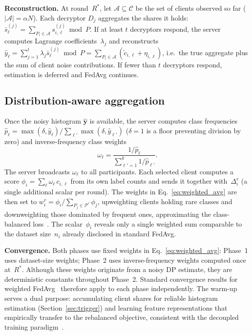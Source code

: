 \documentclass[runningheads]{llncs}
\begin{document}
\textbf{Reconstruction.}
At round~$R^*$, let $\mathcal{A}\!\subseteq\!\mathcal{C}$ be the set of clients observed so far ($|\mathcal{A}|=\alpha N$).
Each decryptor $D_j$ aggregates the shares it holds: $\bar{s}_\ell^{(j)}=\sum_{P_i\in\mathcal{A}}s_{i,\ell}^{(j)}\bmod P$.
If at least $t$ decryptors respond, the server computes Lagrange coefficients~$\lambda_j$ and reconstructs
$\hat{y}_\ell = \sum_{j=1}^{t}\lambda_j\bar{s}_\ell^{(j)}\bmod P
=\sum_{P_i\in\mathcal{A}}(\tilde{c}_{i,\ell}+\eta_{i,\ell})$,
i.e.\ the true aggregate plus the sum of client noise contributions.
If fewer than $t$ decryptors respond, estimation is deferred and FedAvg continues.

\subsection{Distribution-aware aggregation}\label{sec:agg}

Once the noisy histogram $\hat{\mathbf{y}}$ is available, the server computes class frequencies $\hat{p}_\ell=\max(\delta,\hat{y}_\ell)/\sum_{\ell'}\max(\delta,\hat{y}_{\ell'})$ ($\delta\!=\!1$ is a floor preventing division by zero) and inverse-frequency class weights
\begin{equation}\label{eq:omega}
    \omega_\ell = \frac{1/\hat{p}_\ell}{\sum_{\ell'=1}^{k}1/\hat{p}_{\ell'}}.
\end{equation}
The server broadcasts $\omega_\ell$ to all participants.
Each selected client computes a score $\phi_i = \sum_{\ell}\omega_\ell\,c_{i,\ell}$ from its own label counts and sends it together with~$\Delta_i^r$ (a single additional scalar per round).
The weights in Eq.~\eqref{eq:weighted_avg} are then set to $w_i^r = \phi_i / \sum_{P_j\in\mathcal{P}^r} \phi_j$, upweighting clients holding rare classes and downweighting those dominated by frequent ones, approximating the class-balanced loss~\cite{ref_cui2019}.
The scalar~$\phi_i$ reveals only a single weighted sum comparable to the dataset size~$n_i$ already disclosed in standard FedAvg.

\textbf{Convergence.}
Both phases use fixed weights in Eq.~\eqref{eq:weighted_avg}: Phase~1 uses dataset-size weights; Phase~2 uses inverse-frequency weights computed once at~$R^*$.
Although these weights originate from a noisy DP estimate, they are deterministic constants throughout Phase~2.
Standard convergence results for weighted FedAvg~\cite{ref_li_convergence,ref_fednova} therefore apply to each phase independently.
The warm-up serves a dual purpose: accumulating client shares for reliable histogram estimation (Section~\ref{sec:trigger}) and learning feature representations that empirically transfer to the rebalanced objective, consistent with the decoupled training paradigm~\cite{ref_kang2020}.
\end{document}
